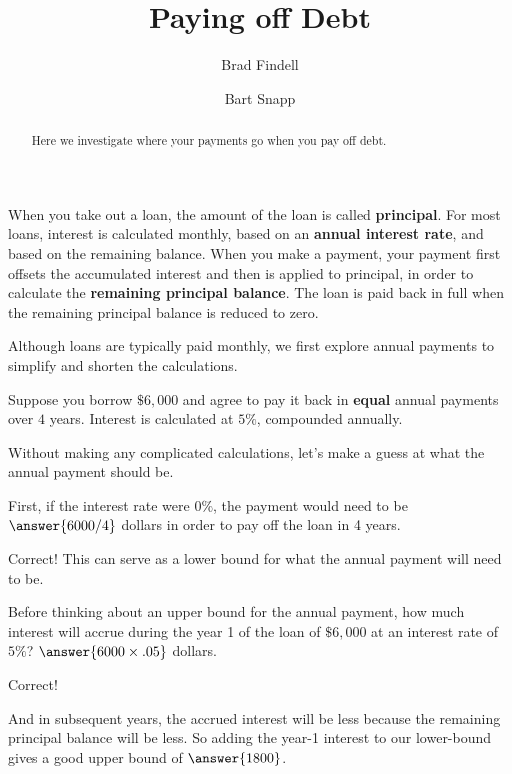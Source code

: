 \documentclass[handout,space,nooutcomes]{ximera}
\title{Paying off Debt}
\author{Brad Findell \and Bart Snapp}
\begin{document}
\begin{abstract}
Here we investigate where your payments go when you pay off debt.
\end{abstract}
\maketitle

When you take out a loan, the amount of the loan is called
\textbf{principal}.  For most loans, interest is calculated monthly,
based on an \textbf{annual interest rate}, and based on the remaining
balance.  When you make a payment, your payment first offsets the
accumulated interest and then is applied to principal, in order to
calculate the \textbf{remaining principal balance}.  The loan is paid
back in full when the remaining principal balance is reduced to zero.


Although loans are typically paid monthly, we first explore annual payments to simplify and shorten the calculations.  

\begin{question}
Suppose you borrow $\$6{,}000$ and agree to pay it back in \textbf{equal} annual
payments over $4$ years.  Interest is calculated at $5\%$,
compounded annually. 

Without making any complicated calculations, let's make a guess at what the annual payment should be.  

First, if the interest rate were $0\%$, the payment would need to be $\answer{6000/4}$ dollars in order to pay off the loan in 4 years.  

\begin{question}
Correct!  This can serve as a lower bound for what the annual payment will need to be.  

Before thinking about an upper bound for the annual payment, how much interest will accrue during the year 1 of the loan of $\$6{,}000$ 
at an interest rate of $5\%$?  
$\answer{6000\times.05}$ dollars.  

\begin{question}
Correct!  

And in subsequent years, the accrued interest will be less because the remaining principal balance will be less.  
So adding the year-1 interest to our lower-bound gives a good upper bound of $\answer{1800}$.  
 
\end{question}
\end{question}
\end{question}
\end{document}
